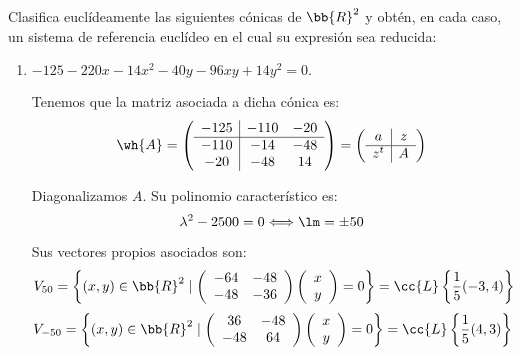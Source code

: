 \begin{ejercicio}
    Clasifica euclídeamente las siguientes cónicas de $\bb{R}^2$ y obtén, en cada caso, un sistema de referencia euclídeo en el cual su expresión sea reducida:
    \begin{enumerate}
        \item $-125 - 220x - 14x^2 - 40y - 96xy + 14y^2 = 0.$
        
        Tenemos que la matriz asociada a dicha cónica es:
        \begin{equation*}
            \wh{A} = \left(\begin{array}{c|cc}
                -125 & -110 & -20  \\ \hline
                -110 & -14 & -48 \\
                -20 &  -48 & 14
            \end{array}\right)
            = \left(\begin{array}{c|c}
                a & z \\ \hline
                z^t & A
            \end{array}\right)
        \end{equation*}
        
        Diagonalizamos $A$. Su polinomio característico es:
        \begin{equation*}
            \lambda^2 -2500 = 0 \Longleftrightarrow \lm = \pm 50
        \end{equation*}

        Sus vectores propios asociados son:
        \begin{equation*}
            V_{50} = \left\{(x,y)\in \bb{R}^2 \mid \left(\begin{array}{cc}
                -64 & -48 \\
                -48 & -36\\ 
            \end{array}\right)\left(\begin{array}{c}
                x\\y
            \end{array}\right)=0 \right\} = \cc{L}\left\{\frac{1}{5}(-3,4)\right\}
        \end{equation*}
        \begin{equation*}
            V_{-50} = \left\{(x,y)\in \bb{R}^2 \mid \left(\begin{array}{cc}
                36 & -48 \\
                -48 & 64\\ 
            \end{array}\right)\left(\begin{array}{c}
                x\\y
            \end{array}\right)=0 \right\} = \cc{L}\left\{\frac{1}{5}(4,3)\right\}
        \end{equation*}


\end{enumerate}
\end{ejercicio}

